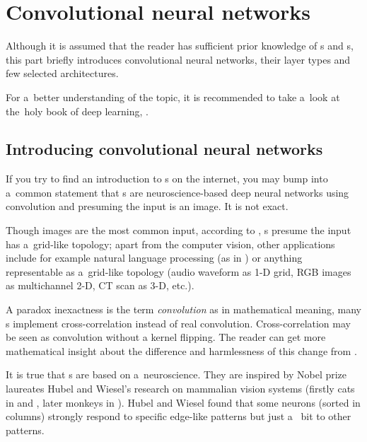 \chapter{Convolutional neural networks}
\label{cnn}


Although it is assumed that the reader has sufficient prior knowledge of
s and s, this part briefly 
introduces convolutional neural networks, their layer types and few selected 
architectures. 

For a~better understanding of the topic, it is recommended to take a~look at
the~holy book of deep learning, \cite{dl}.

\section{Introducing convolutional neural networks}
\label{understanding-cnn}

If you try to find an introduction to s on the internet, you may bump 
into a~common statement that s are neuroscience-based deep neural
networks using convolution and presuming the input is an image. It is not 
exact. 

Though images are the most common input, according to \cite{dl}, s 
presume the input has a~grid-like topology; apart from the computer vision, 
other applications include  for example natural language processing (as in 
\cite{cnn-nlp}) or anything representable as a~grid-like topology (audio 
waveform as 1-D grid, RGB images as multichannel 2-D, CT scan as 3-D, etc.). 

A paradox inexactness is the term \textit{convolution} as in mathematical 
meaning, many s implement cross-correlation instead of real
convolution. Cross-correlation may be seen as convolution without a kernel
flipping. The reader can get more mathematical insight about the difference and
harmlessness of this change from \cite{dl}. 

It is true that s are based on a~neuroscience. They are inspired by 
Nobel prize laureates Hubel and Wiesel's research on mammalian vision systems 
(firstly cats in \cite{hubel-cats1} and \cite{hubel-cats2}, later monkeys in 
\cite{hubel-monkeys}). Hubel and Wiesel found that some neurons (sorted in 
columns) strongly respond to specific edge-like patterns but just a~
bit to other patterns. 


